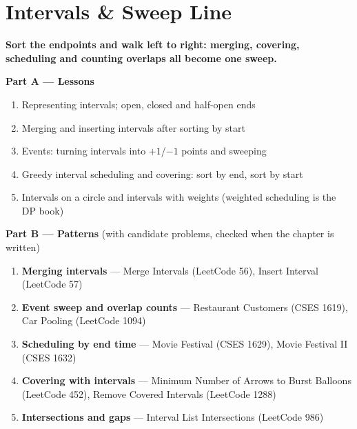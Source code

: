 \chapter{Intervals \& Sweep Line}
\label{ch:intervals}

\begin{tcolorbox}[enhanced, colback=white, colframe=secondaryblue, boxrule=1pt, arc=2mm]
\textbf{\large\textcolor{primaryblue}{Sort the endpoints and walk left to right: merging, covering, scheduling and counting overlaps all become one sweep.}}
\end{tcolorbox}


\begin{plannedbox}
\textbf{Part A --- Lessons}
\begin{enumerate}[leftmargin=*, label=\textbf{A\arabic*.}, itemsep=1pt]
    \item Representing intervals; open, closed and half-open ends
    \item Merging and inserting intervals after sorting by start
    \item Events: turning intervals into $+1$/$-1$ points and sweeping
    \item Greedy interval scheduling and covering: sort by end, sort by start
    \item Intervals on a circle and intervals with weights (weighted scheduling is the DP book)
\end{enumerate}
\textbf{Part B --- Patterns} (with candidate problems, checked when the chapter is written)
\begin{enumerate}[leftmargin=*, label=\textbf{P\arabic*.}, itemsep=1pt]
    \item \textbf{Merging intervals} --- Merge Intervals {\small\color{darkgray}(LeetCode 56)}, Insert Interval {\small\color{darkgray}(LeetCode 57)}
    \item \textbf{Event sweep and overlap counts} --- Restaurant Customers {\small\color{darkgray}(CSES 1619)}, Car Pooling {\small\color{darkgray}(LeetCode 1094)}
    \item \textbf{Scheduling by end time} --- Movie Festival {\small\color{darkgray}(CSES 1629)}, Movie Festival II {\small\color{darkgray}(CSES 1632)}
    \item \textbf{Covering with intervals} --- Minimum Number of Arrows to Burst Balloons {\small\color{darkgray}(LeetCode 452)}, Remove Covered Intervals {\small\color{darkgray}(LeetCode 1288)}
    \item \textbf{Intersections and gaps} --- Interval List Intersections {\small\color{darkgray}(LeetCode 986)}
\end{enumerate}
\end{plannedbox}
